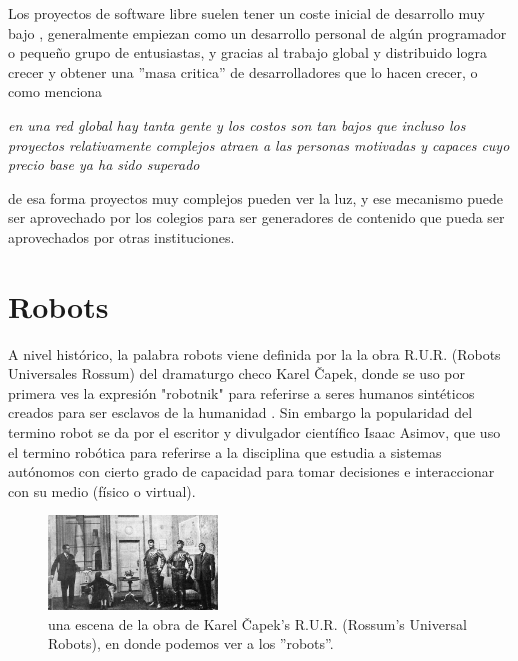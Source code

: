 Los proyectos de software libre suelen tener un coste inicial de desarrollo muy bajo \citep{adell_software_2007}, generalmente empiezan como un desarrollo personal de algún programador o pequeño grupo de entusiastas, y gracias al trabajo global y distribuido logra crecer y obtener una ''masa critica'' de desarrolladores que lo hacen crecer, o como menciona \cite{boyle_second_2003}

\begin{center}
\textit{en una red global hay tanta gente y los costos son tan bajos que incluso los proyectos relativamente complejos atraen a las personas motivadas y capaces cuyo precio base ya ha sido superado}
\end{center}

 de esa forma proyectos muy complejos pueden ver la luz, y ese mecanismo puede ser aprovechado por los colegios para ser generadores de contenido que pueda ser aprovechados por otras instituciones.

\section{Robots}

A nivel histórico, la palabra robots viene definida por la la obra R.U.R. (Robots Universales Rossum) del dramaturgo checo Karel Čapek, donde se uso por primera ves la expresión "robotnik" para referirse a seres humanos sintéticos creados para ser esclavos de la humanidad  \citep{zabala_robotica_2007}. Sin embargo la popularidad del termino robot se da por el escritor y divulgador científico Isaac Asimov, que uso el termino robótica para referirse a la disciplina que estudia a sistemas autónomos con cierto grado de capacidad para tomar decisiones e interaccionar con su medio (físico o virtual).

\begin{figure}
  \begin{center}
    \includegraphics[width=0.4\textwidth]{figuras/Capek_play.jpg}
    \caption[Caption for LOF]{una escena de la obra de Karel Čapek's R.U.R. (Rossum's Universal Robots), en donde podemos ver a los ''robots''.}
       
    \label{fig:reprap }
  \end{center}
\end{figure}

